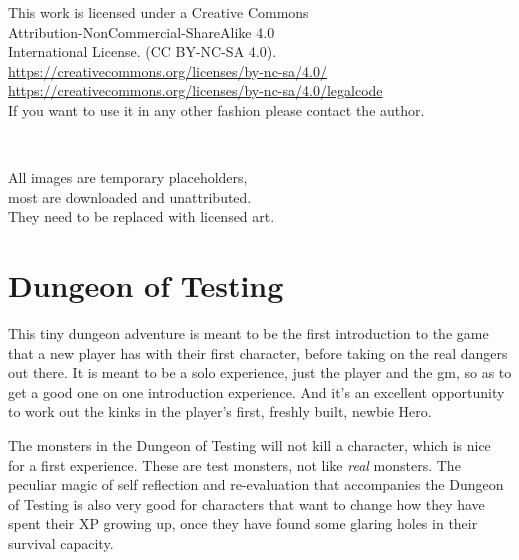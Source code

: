 \vsmall
\noindent 
This work is licensed under a Creative Commons \\
Attribution-NonCommercial-ShareAlike 4.0 \\
International License. (CC BY-NC-SA 4.0).\\
\url{https://creativecommons.org/licenses/by-nc-sa/4.0/} \\
\url{https://creativecommons.org/licenses/by-nc-sa/4.0/legalcode} \\
If you want to use it in any other fashion please contact the author.

\

\noindent
All images are temporary placeholders, \\
most are downloaded and unattributed.\\
They need to be replaced with licensed art.

\normalsize






\cleardoublepage
\pagestyle{fancy}
\raggedbottom




\section*{Dungeon of Testing}

This tiny dungeon adventure is meant to be the first introduction to the game that a new player has with their first character, before taking on the real dangers out there. It is meant to be a solo experience, just the player and the gm, so as to get a good one on one introduction experience. And it's an excellent opportunity to work out the kinks in the player's first, freshly built, newbie Hero.

The monsters in the Dungeon of Testing will not kill a character, which is nice for a first experience. These are test monsters, not like \emph{real} monsters. The peculiar magic of self reflection and re-evaluation that accompanies the Dungeon of Testing is also very good for characters that want to change how they have spent their XP growing up, once they have found some glaring holes in their survival capacity.

